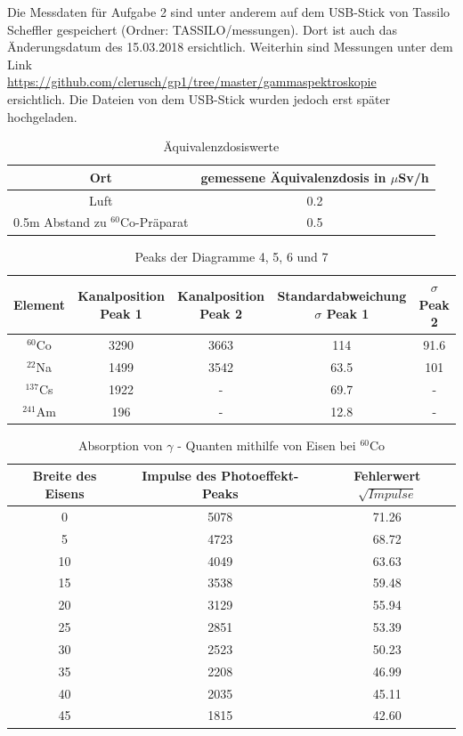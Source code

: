 \documentclass[11pt,a4paper]{article}
\begin{document}
  Die Messdaten für Aufgabe 2 sind unter anderem auf dem USB-Stick von Tassilo Scheffler gespeichert (Ordner: TASSILO/messungen). 
   Dort ist auch das Änderungsdatum des 15.03.2018 ersichtlich. Weiterhin sind Messungen unter dem Link \\ \url{https://github.com/clerusch/gp1/tree/master/gammaspektroskopie}\\ ersichtlich. Die Dateien von dem USB-Stick wurden jedoch erst später hochgeladen.
   
 \begin{table}[h]
 \caption{\"Aquivalenzdosiswerte}
 \centering
 \begin{tabular}{c|c}
 Ort &  gemessene \"Aquivalenzdosis in $\mu$Sv/h \\ \hline
 Luft &  0.2\\
 0.5m Abstand zu $^{60}$Co-Präparat &  0.5\\
 
 \end{tabular}
\end{table}
 \begin{table}[h]
 \caption{Peaks der Diagramme 4, 5, 6 und 7}
 \centering
 \begin{tabular}{c|c|c|c|c}
 Element &  Kanalposition Peak 1 & Kanalposition Peak 2 & Standardabweichung $\sigma$ Peak 1 & $\sigma$ Peak 2 \\ \hline
 $^{60}$Co &  3290 & 3663 & 114 & 91.6\\
 $^{22}$Na & 1499 & 3542 & 63.5 & 101\\
 $^{137}$Cs & 1922 & - & 69.7 & -\\
 $^{241}$Am & 196 & - & 12.8 & -\\

 
 \end{tabular}
\end{table}

\begin{table}[h]
\caption{Absorption von $\gamma$ - Quanten mithilfe von Eisen bei $^{60}$Co}
\centering
\begin{tabular}{c|c|c}
 Breite des Eisens & Impulse des Photoeffekt-Peaks & Fehlerwert $\sqrt{Impulse}$\\\hline
 0 & 5078 & 71.26\\
 5 & 4723 & 68.72\\
 10 & 4049 & 63.63\\
 15 & 3538 & 59.48\\
 20 & 3129 & 55.94\\
 25 & 2851 & 53.39\\
 30 & 2523 & 50.23\\
 35 & 2208 & 46.99\\
 40 & 2035 & 45.11\\
 45 & 1815 & 42.60\\
\end{tabular}
\end{table}
\end{document}
